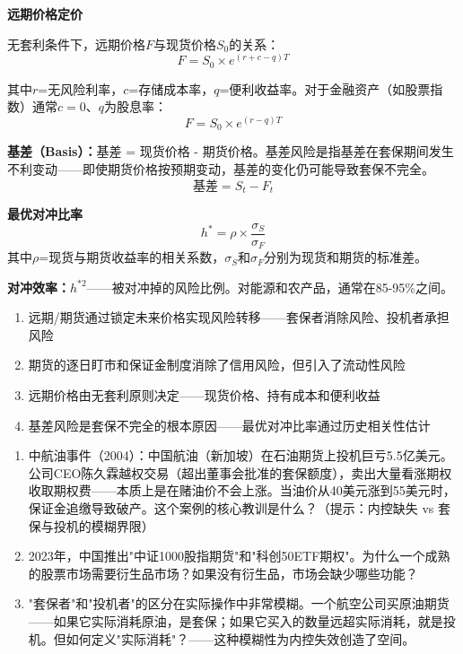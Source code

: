 \documentclass[a4paper,11pt]{ctexbook}
\begin{document}
\begin{quantitative}
\textbf{远期价格定价}

无套利条件下，远期价格$F$与现货价格$S_0$的关系：
\[
F = S_0 \times e^{(r + c - q)T}
\]

其中$r$=无风险利率，$c$=存储成本率，$q$=便利收益率。对于金融资产（如股票指数）通常$c=0$、$q$为股息率：
\[
F = S_0 \times e^{(r - q)T}
\]

\textbf{基差（Basis）：}基差 = 现货价格 - 期货价格。基差风险是指基差在套保期间发生不利变动——即使期货价格按预期变动，基差的变化仍可能导致套保不完全。
\[
\text{基差} = S_t - F_t
\]

\textbf{最优对冲比率}
\[
h^* = \rho \times \frac{\sigma_S}{\sigma_F}
\]
其中$\rho$=现货与期货收益率的相关系数，$\sigma_S$和$\sigma_F$分别为现货和期货的标准差。

\textbf{对冲效率：}$h^{*2}$——被对冲掉的风险比例。对能源和农产品，通常在85-95\%之间。
\end{quantitative}

\begin{lessonsummary}
\begin{enumerate}
  \item 远期/期货通过锁定未来价格实现风险转移——套保者消除风险、投机者承担风险
  \item 期货的逐日盯市和保证金制度消除了信用风险，但引入了流动性风险
  \item 远期价格由无套利原则决定——现货价格、持有成本和便利收益
  \item 基差风险是套保不完全的根本原因——最优对冲比率通过历史相关性估计
\end{enumerate}
\end{lessonsummary}

\begin{discuss}
\begin{enumerate}
  \item 中航油事件（2004）：中国航油（新加坡）在石油期货上投机巨亏5.5亿美元。公司CEO陈久霖越权交易（超出董事会批准的套保额度），卖出大量看涨期权收取期权费——本质上是在赌油价不会上涨。当油价从40美元涨到55美元时，保证金追缴导致破产。这个案例的核心教训是什么？（提示：内控缺失 vs 套保与投机的模糊界限）
  \item 2023年，中国推出"中证1000股指期货"和"科创50ETF期权"。为什么一个成熟的股票市场需要衍生品市场？如果没有衍生品，市场会缺少哪些功能？
  \item "套保者"和"投机者"的区分在实际操作中非常模糊。一个航空公司买原油期货——如果它实际消耗原油，是套保；如果它买入的数量远超实际消耗，就是投机。但如何定义"实际消耗"？——这种模糊性为内控失效创造了空间。
\end{enumerate}
\end{discuss}
\end{document}
